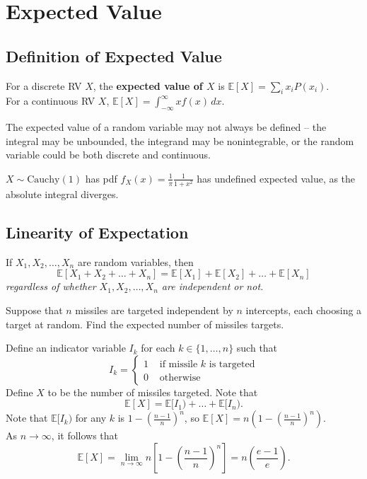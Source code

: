 \newpage

\section{Expected Value}
\subsection{Definition of Expected Value}
\begin{definition}
For a discrete RV $X$, the \textbf{expected value of $X$} is $\mathbb{E}[X] = \sum_i x_i P(x_i)$. \\

For a continuous RV $X$, $\mathbb{E}[X] = \int_{-\infty}^{\infty} xf(x) \, dx$.
\end{definition}

\begin{remark}
The expected value of a random variable may not always be defined -- the integral may be unbounded, the integrand may be nonintegrable, 
or the random variable could be both discrete and continuous.
\end{remark}

\begin{eg}
$X \sim \mathrm{Cauchy}(1)$ has pdf $f_X(x) = \frac{1}{\pi} \frac{1}{1+x^2}$ has undefined expected value, as the 
absolute integral diverges.
\end{eg}

\subsection{Linearity of Expectation}
\begin{definition}
If $X_1, X_2, \dots, X_n$ are random variables, then
\[
    \mathbb{E}[X_1 + X_2 + \dots + X_n] = \mathbb{E}[X_1] + \mathbb{E}[X_2] + \dots + \mathbb{E}[X_n]
\]
\textit{regardless of whether $X_1, X_2, \dots, X_n$ are independent or not.}
\end{definition}

\begin{eg}
Suppose that $n$ missiles are targeted independent by $n$ intercepts, each choosing a target at random. Find the expected number of missiles targets.
\end{eg}

\begin{answer}
Define an indicator variable $I_k$ for each $k \in \{ 1, \dots, n \}$ such that
\[
    I_k = \begin{cases}
        1 &\text{ if missile } k \text{ is targeted}  \\
        0 &\text{ otherwise } 
    \end{cases}
\]
Define $X$ to be the number of missiles targeted. Note that
\[
    \mathbb{E}[X] = \mathbb{E}[I_1) + \dots + \mathbb{E}[I_n).
\]
Note that $\mathbb{E}[I_k)$ for any $k$ is $1 - \left( \frac{n-1}{n} \right)^n$, so $\mathbb{E}[X] = n(1 - \left( \frac{n-1}{n} \right)^n)$. \\
As $n \rightarrow \infty$, it follows that 
\[
    \mathbb{E}[X] = \lim_{n \to \infty} n\left[1 - \left( \frac{n-1}{n} \right)^n\right] = n\left( \frac{e-1}{e} \right).
\]
\end{answer}

